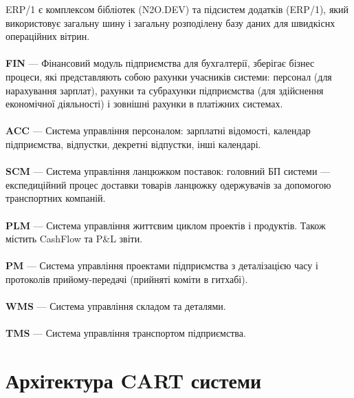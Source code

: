 ERP/1 є комплексом бібліотек (N2O.DEV) та підсистем додатків (ERP/1),
який використовує загальну шину і загальну розподілену базу даних для швидкіснх операційних вітрин.
\\
\\
\textbf{FIN} — Фінансовий модуль підприємства для бухгалтерії, зберігає бізнес процеси,
        які представляють собою рахунки учасників системи: персонал (для нарахування зарплат),
        рахунки та субрахунки підприємства (для здійснення економічної діяльності) і
        зовнішні рахунки в платіжних системах.
\\
\\
\textbf{ACC} — Система управління персоналом: зарплатні відомості,
        календар підприємства, відпустки, декретні відпустки, інші календарі.
\\
\\
\textbf{SCM} — Система управління ланцюжком поставок: головний БП системи —
           експедиційний процес доставки товарів ланцюжку одержувачів
           за допомогою транспортних компаній.
\\
\\
\textbf{PLM} — Система управління життєвим циклом проектів і продуктів.
           Також містить CashFlow та P\&L звіти.
\\
\\
\textbf{PM} — Система управління проектами підприємства з деталізацією
           часу і протоколів прийому-передачі (прийняті коміти в гитхабі).
\\
\\
\textbf{WMS} — Система управління складом та деталями.
\\
\\
\textbf{TMS} — Система управління транспортом підприємства.

\section{Архітектура CART системи}

